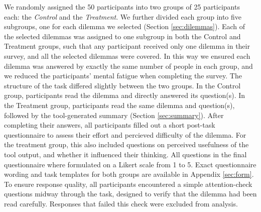 We randomly assigned the 50 participants into two groups of 25 participants each: the \textit{Control} and the \textit{Treatment}.
We further divided each group into five subgroups, one for each dilemma we selected (Section \ref{sec:dilemmas}).
Each of the selected dilemmas was assigned to one subgroup in both the Control and Treatment groups, such that any participant received only one dilemma in their survey, and all the selected dilemmas were covered.
In this way we ensured each dilemma was answered by exactly the same number of people in each group, and we reduced the participants' mental fatigue when completing the survey.
The structure of the task differed slightly between the two groups.
In the Control group, participants read the dilemma and directly answered its question(s).
In the Treatment group, participants read the same dilemma and question(s), followed by the tool-generated summary (Section \ref{sec:summary}).
After completing their answers, all participants filled out a short post-task questionnaire to assess their effort and percieved difficulty of the dilemma.
For the treatment group, this also included questions on perceived usefulness of the tool output, and whether it influenced their thinking.
All questions in the final questionnaire where formulated on a Likert scale from 1 to 5.
Exact questionnaire wording and task templates for both groups are available in Appendix \ref{sec:form}.
To ensure response quality, all participants encountered a simple attention-check questions midway through the task, designed to verify that the dilemma had been read carefully. Responses that failed this check were excluded from analysis.
